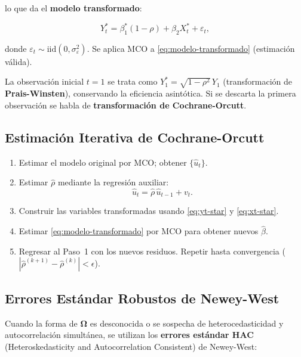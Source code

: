 \documentclass[12pt,a4paper]{article}
\theoremstyle{definition}
\theoremstyle{remark}
\begin{document}
lo que da el \textbf{modelo transformado}:

\begin{equation}
  Y_t^* = \beta_1^*(1-\rho) + \beta_2 X_t^* + \varepsilon_t,
  \label{eq:modelo-transformado}
\end{equation}

donde $\varepsilon_t \sim \text{iid}(0,\sigma_\varepsilon^2)$.
Se aplica MCO a \eqref{eq:modelo-transformado} (estimación válida).

\begin{nota}
  La observación inicial $t = 1$ se trata como $Y_1^* =
  \sqrt{1-\rho^2}\,Y_1$ (transformación de \textbf{Prais-Winsten}),
  conservando la eficiencia asintótica. Si se descarta la primera
  observación se habla de \textbf{transformación de Cochrane-Orcutt}.
\end{nota}

\subsection{Estimación Iterativa de Cochrane-Orcutt}

\begin{enumerate}[label=\textbf{Paso \arabic*.}, leftmargin=3em, itemsep=6pt]
  \item Estimar el modelo original por MCO; obtener $\{\hat u_t\}$.
  \item Estimar $\hat\rho$ mediante la regresión auxiliar:
        \begin{equation}
          \hat u_t = \hat\rho\,\hat u_{t-1} + v_t.
          \label{eq:rho-auxiliar}
        \end{equation}
  \item Construir las variables transformadas usando \eqref{eq:yt-star}
        y \eqref{eq:xt-star}.
  \item Estimar \eqref{eq:modelo-transformado} por MCO para obtener
        nuevos $\hat\beta$.
  \item Regresar al Paso~1 con los nuevos residuos. Repetir hasta
        convergencia ($|\hat\rho^{(k+1)} - \hat\rho^{(k)}| < \epsilon$).
\end{enumerate}

\subsection{Errores Estándar Robustos de Newey-West}

Cuando la forma de $\boldsymbol{\Omega}$ es desconocida o se sospecha
de heterocedasticidad y autocorrelación simultánea, se utilizan los
\textbf{errores estándar HAC} (Heteroskedasticity and Autocorrelation
Consistent) de Newey-West:
\end{document}
